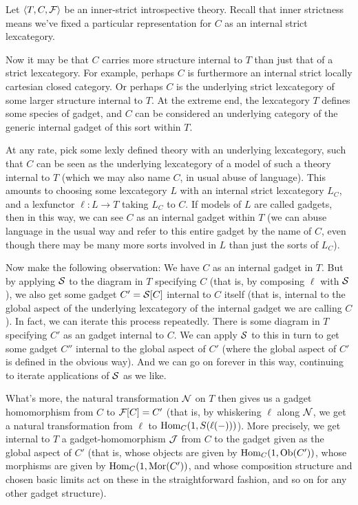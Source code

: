 \begin{observation}\label{IntrospContainsGLObservation}
Let $\langle T, C, \mathcal{F}\rangle$ be an inner-strict introspective theory. Recall that inner strictness means we've fixed a particular representation for $C$ as an internal strict lexcategory.

Now it may be that $C$ carries more structure internal to $T$ than just that of a strict lexcategory. For example, perhaps $C$ is furthermore an internal strict locally cartesian closed category. Or perhaps $C$ is the underlying strict lexcategory of some larger structure internal to $T$. At the extreme end, the lexcategory $T$ defines some species of gadget, and $C$ can be considered an underlying category of the generic internal gadget of this sort within $T$.

At any rate, pick some lexly defined theory with an underlying lexcategory, such that $C$ can be seen as the underlying lexcategory of a model of such a theory internal to $T$ (which we may also name $C$, in usual abuse of language). This amounts to choosing some lexcategory $L$ with an internal strict lexcategory $L_C$, and a lexfunctor $\ell: L \to T$ taking $L_C$ to $C$. If models of $L$ are called gadgets, then in this way, we can see $C$ as an internal gadget within $T$ (we can abuse language in the usual way and refer to this entire gadget by the name of $C$, even though there may be many more sorts involved in $L$ than just the sorts of $L_C$).

Now make the following observation: We have $C$ as an internal gadget in $T$. But by applying $\mathcal{S}$ to the diagram in $T$ specifying $C$ (that is, by composing $\ell$ with $\mathcal{S}$), we also get some gadget $C' = \mathcal{S}[C]$ internal to $C$ itself (that is, internal to the global aspect of the underlying lexcategory of the internal gadget we are calling $C$). In fact, we can iterate this process repeatedly. There is some diagram in $T$ specifying $C'$ as an gadget internal to $C$. We can apply $\mathcal{S}$ to this in turn to get some gadget $C''$ internal to the global aspect of $C'$ (where the global aspect of $C'$ is defined in the \TODO obvious way). And we can go on forever in this way, continuing to iterate applications of $\mathcal{S}$ as we like.

What's more, the natural transformation $\mathcal{N}$ on $T$ then gives us a gadget homomorphism from $C$ to $\mathcal{F}[C] = C'$ (that is, by whiskering $\ell$ along $\mathcal{N}$, we get a natural transformation from $\ell$ to $\operatorname{Hom}_C(1, S(\ell(-)))$). More precisely, we get internal to $T$ a gadget-homomorphism $\mathcal{J}$ from $C$ to the gadget given as the global aspect of $C'$ (that is, whose objects are given by $\operatorname{Hom}_C(1, \operatorname{Ob}(C'))$, whose morphisms are given by $\operatorname{Hom}_C(1, \operatorname{Mor}(C'))$, and whose composition structure and chosen basic limits act on these in the straightforward fashion, and so on for any other gadget structure).


\end{observation}

